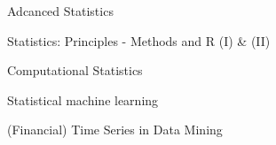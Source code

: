 \begin{cventries}
\cventry
  {Adcanced Statistics} %
  {} %
  {} %
  {} %
  {
    \begin{cvitems} %
      \item {Statistics: Principles - Methods and R (I) \& (II)}
      \item {Computational Statistics}
      \item {Statistical machine learning}
      \item {(Financial) Time Series in Data Mining}
    \end{cvitems}
  }

\end{cventries}
